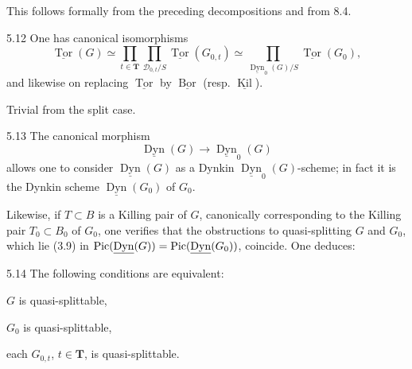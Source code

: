 This follows formally from the preceding decompositions and from 8.4.
\begin{corollary}{5.12}\label{XXIV.5.12}
One has canonical isomorphisms
\[
\underline{\operatorname{Tor}}(G)\simeq\prod_{t\in\mathbf T}\prod_{\mathscr D_{0,t}/S}\underline{\operatorname{Tor}}(G_{0,t})\simeq\prod_{\underline{\operatorname{Dyn}}_0(G)/S}\underline{\operatorname{Tor}}(G_0),
\]
and likewise on replacing $\underline{\operatorname{Tor}}$ by $\underline{\operatorname{Bor}}$ (resp. $\underline{\operatorname{Kil}}$).
\end{corollary}
Trivial from the split case.
\begin{remark}{5.13}\label{XXIV.5.13}
The canonical morphism
\[
\underline{\operatorname{Dyn}}(G)\to\underline{\operatorname{Dyn}}_0(G)
\]
allows one to consider $\underline{\operatorname{Dyn}}(G)$ as a Dynkin $\underline{\operatorname{Dyn}}_0(G)$-scheme; in fact it is the Dynkin scheme $\underline{\operatorname{Dyn}}(G_0)$ of $G_0$.

Likewise, if $T\subset B$ is a Killing pair of $G$, canonically corresponding to the Killing pair $T_0\subset B_0$ of $G_0$, one verifies that the obstructions to quasi-splitting $G$ and $G_0$, which lie (3.9) in $\operatorname{Pic}(\underline{\operatorname{Dyn}}(G))=\operatorname{Pic}(\underline{\operatorname{Dyn}}(G_0))$, coincide. One deduces:
\end{remark}
\begin{corollary}{5.14}\label{XXIV.5.14}
The following conditions are equivalent:
\begin{enumeratei}
\item $G$ is quasi-splittable,
\item $G_0$ is quasi-splittable,
\item each $G_{0,t}$, $t\in\mathbf T$, is quasi-splittable.
\end{enumeratei}
\end{corollary}

